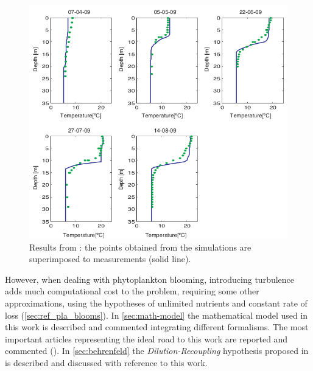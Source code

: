 \begin{figure} [ht]
\centering
    \includegraphics[width=\textwidth]{img/references/medrano2013profiles}
    \caption{Results from \autocite{medrano2013coupling}: the points obtained from the simulations are superimposed to measurements (solid line).}
    \label{fig:medrano2016}
\end{figure}

However, when dealing with phytoplankton blooming, introducing turbulence adds much computational cost to the problem, requiring some other approximations, using the hypotheses of unlimited nutrients and constant rate of loss (\autoref{sec:ref_pla_blooms}). In \autoref{sec:math-model} the mathematical model used in this work is described and commented integrating different formalisms. The most important articles representing the ideal road to this work are reported and commented (\autocite{Sverdrup1953OnPhytoplankton, Huisman2002HowPersist, Taylor2011ShutdownBlooms}). In \autoref{sec:behrenfeld} the \textit{Dilution-Recoupling} hypothesis proposed in \autocite{Behrenfeld2010AbandoningBlooms} is described and discussed with reference to this work.

